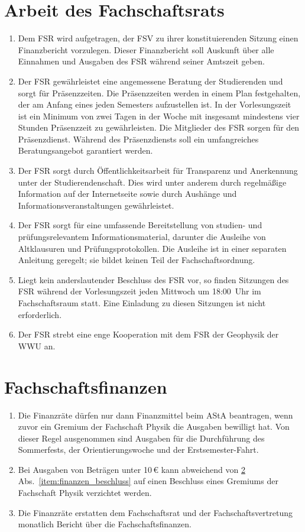 \section{Arbeit des Fachschaftsrats}
\begin{enumerate}
	\item Dem FSR wird aufgetragen, der FSV zu ihrer konstituierenden Sitzung einen Finanzbericht vorzulegen.
	Dieser Finanzbericht soll Auskunft über alle Einnahmen und Ausgaben des FSR während seiner Amtszeit geben.
	\item Der FSR gewährleistet eine angemessene Beratung der Studierenden und sorgt für Präsenzzeiten.
	Die Präsenzzeiten werden in einem Plan festgehalten, der am Anfang eines jeden Semesters aufzustellen ist.
	In der Vorlesungszeit ist ein Minimum von zwei Tagen in der Woche mit insgesamt mindestens vier Stunden Präsenzzeit zu gewährleisten.
	Die Mitglieder des FSR sorgen für den Präsenzdienst.
	Während des Präsenzdiensts soll ein umfangreiches Beratungsangebot garantiert werden.
	\item Der FSR sorgt durch Öffentlichkeitsarbeit für Transparenz und Anerkennung unter der Studierendenschaft.
	Dies wird unter anderem durch regelmäßige Information auf der Internetseite sowie durch Aushänge und Informationsveranstaltungen gewährleistet.
	\item Der FSR sorgt für eine umfassende Bereitstellung von studien- und prüfungsrelevantem Informationsmaterial, darunter die Ausleihe von Altklausuren und Prüfungsprotokollen.
	Die Ausleihe ist in einer separaten Anleitung geregelt; sie bildet keinen Teil der Fachschaftsordnung.
	\item Liegt kein anderslautender Beschluss des FSR vor, so finden Sitzungen des FSR während der Vorlesungszeit jeden Mittwoch um 18:00~Uhr im Fachschaftsraum statt.
	Eine Einladung zu diesen Sitzungen ist nicht erforderlich.
	\item Der FSR strebt eine enge Kooperation mit dem FSR der Geophysik der WWU an.
\end{enumerate}

\section{Fachschaftsfinanzen}
\label{sec:finanzen}
\begin{enumerate}
	\item \label{item:finanzen_beschluss}
Die Finanzräte dürfen nur dann Finanzmittel beim AStA beantragen, wenn zuvor ein Gremium der Fachschaft Physik die Ausgaben bewilligt hat.
	Von dieser Regel ausgenommen sind Ausgaben für die Durchführung des Sommerfests, der Orientierungswoche und der Erstsemester-Fahrt.
	\item Bei Ausgaben von Beträgen unter 10\,€ kann abweichend von \ref{sec:finanzen} Abs.~\ref{item:finanzen_beschluss} auf einen Beschluss eines Gremiums der Fachschaft Physik verzichtet werden.
	\item Die Finanzräte erstatten dem Fachschaftsrat und der Fachschaftsvertretung monatlich Bericht über die Fachschaftsfinanzen.
\end{enumerate}

